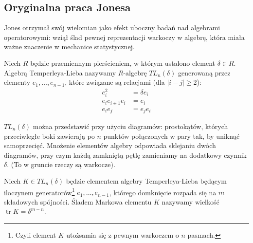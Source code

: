 \subsection{Oryginalna praca Jonesa} %
\label{sub:jones_paper}
Jones otrzymał swój wielomian jako efekt uboczny badań nad algebrami operatorowymi: wziął ślad pewnej reprezentacji warkoczy w algebrę, która miała ważne znaczenie w mechanice statystycznej.


\begin{definition}
	Niech $R$ będzie przemiennym pierścieniem, w którym ustalono element $\delta \in R$.
	Algebrą Temperleya-Lieba nazywamy $R$-algebrę $TL_n(\delta)$ generowaną przez elementy $e_1, \ldots, e_{n-1}$, które związane są relacjami (dla $|i-j| \ge 2$):
	\begin{align*}
		e_i^2 & = \delta e_i \\
		e_i e_{i \pm 1} e_i & = e_i \\
		e_i e_j & = e_j e_i
	\end{align*}
\end{definition}

$TL_n(\delta)$ można przedstawić przy użyciu diagramów: prostokątów, których przeciwległe boki zawierają po $n$ punktów połączonych w pary tak, by uniknąć samoprzecięć. Mnożenie elementów algebry odpowiada sklejaniu dwóch diagramów, przy czym każdą zamkniętą pętlę zamieniamy na dodatkowy czynnik $\delta$.
(To w gruncie rzeczy są warkocze).

\begin{definition}
	Niech $K \in TL_n(\delta)$ będzie elementem algebry Temperleya-Lieba będącym iloczynem generatorów\footnote{Czyli element $K$ utożsamia się z pewnym warkoczem o $n$ pasmach.} $e_1, \ldots, e_{n-1}$, którego domknięcie rozpada się na $m$ składowych spójności.
	Śladem Markowa elementu $K$ nazywamy wielkość $\operatorname{tr} K = \delta^{m-n}$.
\end{definition}

